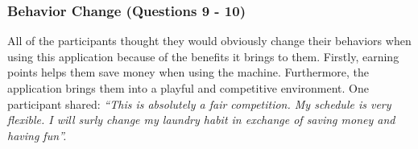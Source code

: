 \subsubsection{Behavior Change (Questions 9 - 10)}
All of the participants thought they would obviously change their behaviors when using this application because of the benefits it brings to them. Firstly, earning points helps them save money when using the machine. Furthermore, the application brings them into a playful and competitive environment. One participant shared: \textit{``This is absolutely a fair competition. My schedule is very flexible. I will surly change my laundry habit in exchange of saving money and having fun''.}